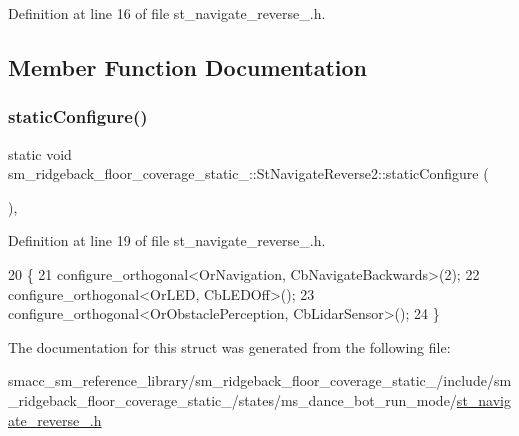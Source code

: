 Definition at line 16 of file st\+\_\+navigate\+\_\+reverse\+\_.\+h.



\subsection{Member Function Documentation}
\mbox{\label{structsm__ridgeback__floor__coverage__static__1_1_1StNavigateReverse2_a471cc803170e9e053d9f497c29120e75}} 
\subsubsection{\texorpdfstring{static\+Configure()}{staticConfigure()}}
{\footnotesize\ttfamily static void sm\+\_\+ridgeback\+\_\+floor\+\_\+coverage\+\_\+static\+\_\+::\+St\+Navigate\+Reverse2\+::static\+Configure (\begin{DoxyParamCaption}{ }\end{DoxyParamCaption})\hspace{0.3cm}{\ttfamily [inline]}, {\ttfamily [static]}}



Definition at line 19 of file st\+\_\+navigate\+\_\+reverse\+\_.\+h.


\begin{DoxyCode}
20       \{
21          configure\_orthogonal<OrNavigation, CbNavigateBackwards>(2);
22          configure\_orthogonal<OrLED, CbLEDOff>();
23          configure\_orthogonal<OrObstaclePerception, CbLidarSensor>();
24       \}
\end{DoxyCode}


The documentation for this struct was generated from the following file\+:\begin{DoxyCompactItemize}
\item 
smacc\+\_\+sm\+\_\+reference\+\_\+library/sm\+\_\+ridgeback\+\_\+floor\+\_\+coverage\+\_\+static\+\_/include/sm\+\_\+ridgeback\+\_\+floor\+\_\+coverage\+\_\+static\+\_/states/ms\+\_\+dance\+\_\+bot\+\_\+run\+\_\+mode/\hyperlink{sm__ridgeback__floor__coverage__static__1_2include_2sm__ridgeback__floor__coverage__static__1_2s3ab06397b54898f0c3c4d185b5a14ba0}{st\+\_\+navigate\+\_\+reverse\+\_.\+h}\end{DoxyCompactItemize}
